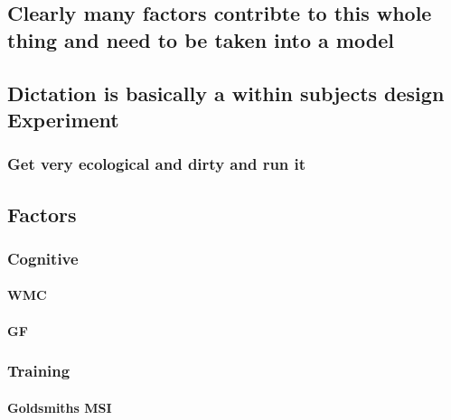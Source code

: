 \documentclass[]{book}
\let\oldparagraph\paragraph
\renewcommand{\paragraph}[1]{\oldparagraph{#1}\mbox{}}
\theoremstyle{definition}
\theoremstyle{definition}
\theoremstyle{definition}
\theoremstyle{remark}
\begin{document}
\hypertarget{clearly-many-factors-contribte-to-this-whole-thing-and-need-to-be-taken-into-a-model}{%
\subsection{Clearly many factors contribte to this whole thing and need
to be taken into a
model}\label{clearly-many-factors-contribte-to-this-whole-thing-and-need-to-be-taken-into-a-model}}

\hypertarget{dictation-is-basically-a-within-subjects-design-experiment}{%
\subsection{Dictation is basically a within subjects design
Experiment}\label{dictation-is-basically-a-within-subjects-design-experiment}}

\hypertarget{get-very-ecological-and-dirty-and-run-it}{%
\subsubsection{Get very ecological and dirty and run
it}\label{get-very-ecological-and-dirty-and-run-it}}

\hypertarget{factors}{%
\subsection{Factors}\label{factors}}

\hypertarget{cognitive-1}{%
\subsubsection{Cognitive}\label{cognitive-1}}

\hypertarget{wmc}{%
\paragraph{WMC}\label{wmc}}

\hypertarget{gf}{%
\paragraph{GF}\label{gf}}

\hypertarget{training}{%
\subsubsection{Training}\label{training}}

\hypertarget{goldsmiths-msi}{%
\paragraph{Goldsmiths MSI}\label{goldsmiths-msi}}
\end{document}
